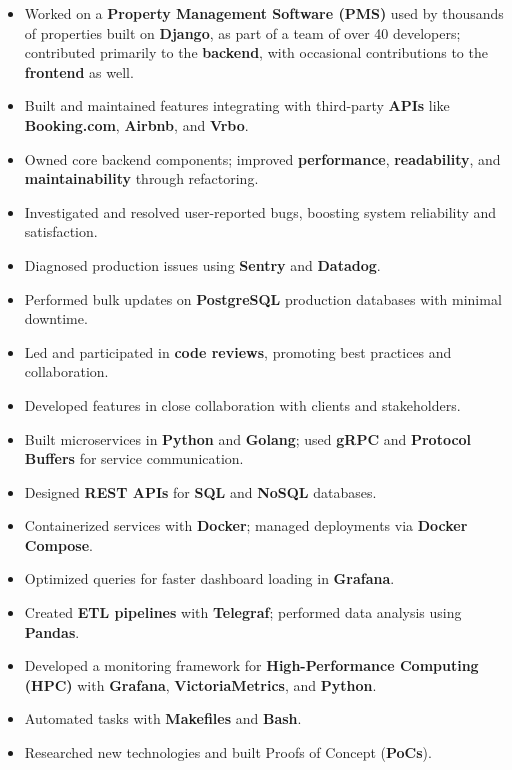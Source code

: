 
\begin{itemize}
    \item Worked on a \textbf{Property Management Software (PMS)} used by thousands of properties built on \textbf{Django}, as part of a team of over 40 developers; contributed primarily to the \textbf{backend}, with occasional contributions to the \textbf{frontend} as well.
    \item Built and maintained features integrating with third-party \textbf{APIs} like \textbf{Booking.com}, \textbf{Airbnb}, and \textbf{Vrbo}.
    \item Owned core backend components; improved \textbf{performance}, \textbf{readability}, and \textbf{maintainability} through refactoring.
    \item Investigated and resolved user-reported bugs, boosting system reliability and satisfaction.
    \item Diagnosed production issues using \textbf{Sentry} and \textbf{Datadog}.
    \item Performed bulk updates on \textbf{PostgreSQL} production databases with minimal downtime.
    \item Led and participated in \textbf{code reviews}, promoting best practices and collaboration.
\end{itemize}

\begin{itemize}
    \item Developed features in close collaboration with clients and stakeholders.
    \item Built microservices in \textbf{Python} and \textbf{Golang}; used \textbf{gRPC} and \textbf{Protocol Buffers} for service communication.
    \item Designed \textbf{REST APIs} for \textbf{SQL} and \textbf{NoSQL} databases.
    \item Containerized services with \textbf{Docker}; managed deployments via \textbf{Docker Compose}.
    \item Optimized queries for faster dashboard loading in \textbf{Grafana}.
    \item Created \textbf{ETL pipelines} with \textbf{Telegraf}; performed data analysis using \textbf{Pandas}.
    \item Developed a monitoring framework for \textbf{High-Performance Computing (HPC)} with \textbf{Grafana}, \textbf{VictoriaMetrics}, and \textbf{Python}.
    \item Automated tasks with \textbf{Makefiles} and \textbf{Bash}.
    \item Researched new technologies and built Proofs of Concept (\textbf{PoCs}).
\end{itemize}
